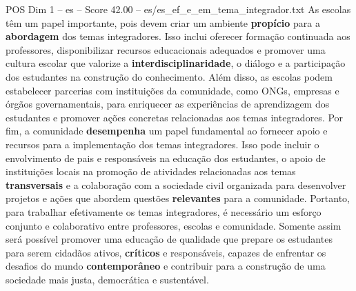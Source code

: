 \begin{textsample}{POS Dim 1 – es – Score 42.00 – es/es\_ef\_e\_em\_tema\_integrador.txt}
As escolas têm um papel importante, pois devem criar um ambiente \textbf{propício} para a \textbf{abordagem} dos temas integradores.
Isso inclui oferecer formação continuada aos professores, disponibilizar recursos educacionais adequados e promover uma cultura escolar que valorize a \textbf{interdisciplinaridade}, o diálogo e a participação dos estudantes na construção do conhecimento.
Além disso, as escolas podem estabelecer parcerias com instituições da comunidade, como ONGs, empresas e órgãos governamentais, para enriquecer as experiências de aprendizagem dos estudantes e promover ações concretas relacionadas aos temas integradores.
Por fim, a comunidade \textbf{desempenha} um papel fundamental ao fornecer apoio e recursos para a implementação dos temas integradores.
Isso pode incluir o envolvimento de pais e responsáveis na educação dos estudantes, o apoio de instituições locais na promoção de atividades relacionadas aos temas \textbf{transversais} e a colaboração com a sociedade civil organizada para desenvolver projetos e ações que abordem questões \textbf{relevantes} para a comunidade.
Portanto, para trabalhar efetivamente os temas integradores, é necessário um esforço conjunto e colaborativo entre professores, escolas e comunidade.
Somente assim será possível promover uma educação de qualidade que prepare os estudantes para serem cidadãos ativos, \textbf{críticos} e responsáveis, capazes de enfrentar os desafios do mundo \textbf{contemporâneo} e contribuir para a construção de uma sociedade mais justa, democrática e sustentável.

\end{textsample}
